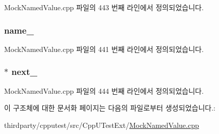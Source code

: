 Mock\+Named\+Value.\+cpp 파일의 443 번째 라인에서 정의되었습니다.

\subsubsection[{\texorpdfstring{name\+\_\+}{name_}}]{ name\+\_\+}\hypertarget{struct_mock_named_value_comparators_and_copiers_repository_node_aac73c86e1e892f392d1fc423e25f51a8}{}\label{struct_mock_named_value_comparators_and_copiers_repository_node_aac73c86e1e892f392d1fc423e25f51a8}


Mock\+Named\+Value.\+cpp 파일의 441 번째 라인에서 정의되었습니다.

\subsubsection[{\texorpdfstring{next\+\_\+}{next_}}]{$\ast$ next\+\_\+}\hypertarget{struct_mock_named_value_comparators_and_copiers_repository_node_a2764dc799ce6105dd7b5a74a0aae8f6e}{}\label{struct_mock_named_value_comparators_and_copiers_repository_node_a2764dc799ce6105dd7b5a74a0aae8f6e}


Mock\+Named\+Value.\+cpp 파일의 444 번째 라인에서 정의되었습니다.



이 구조체에 대한 문서화 페이지는 다음의 파일로부터 생성되었습니다.\+:\begin{DoxyCompactItemize}
\item 
thirdparty/cpputest/src/\+Cpp\+U\+Test\+Ext/\hyperlink{_mock_named_value_8cpp}{Mock\+Named\+Value.\+cpp}\end{DoxyCompactItemize}
